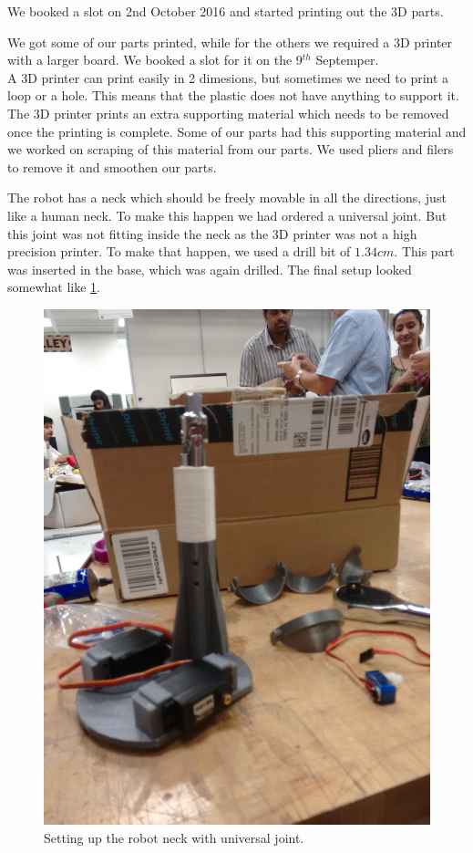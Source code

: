 \documentclass[index=totoc,hyperref,openany]{labbook} %
\begin{document}
We booked a slot on 2nd October 2016 and started printing out the 3D parts.


{\let\clearpage\relax {}}

We got some of our parts printed, while for the others we required a 3D printer with a larger board. We booked a slot for it on the 9$^{th}$ Septemper.\\
A 3D printer can print easily in 2 dimesions, but sometimes we need to print a loop or a hole. This means that the plastic does not have anything to support it. The 3D printer prints an extra supporting material which needs to be removed once the printing is complete. Some of our parts had this supporting material and we worked on scraping of this material from our parts. We used pliers and filers to remove it and smoothen our parts.


{\let\clearpage\relax {}}

The robot has a neck which should be freely movable in all the directions, just like a human neck. To make this happen we had ordered a universal joint. But this joint was not fitting inside the neck as the 3D printer was not a high precision printer. To make that happen, we used a drill bit of $1.34cm$. This part was inserted in the base, which was again drilled. The final setup looked somewhat like \ref{fig:neck_joint}.

\begin{figure}[H] %
\begin{center}
\includegraphics[width=0.4\linewidth]{neck_joint}
\end{center}
\caption{Setting up the robot neck with universal joint.}
\label{fig:neck_joint}
\end{figure}
\end{document}
